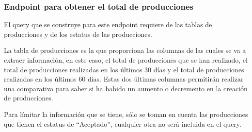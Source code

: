 \subsubsection{Endpoint para obtener el total de producciones}
El query que se construye para este endpoint requiere de las tablas de producciones y de los estatus de las producciones. 

La tabla de producciones es la que proporciona las columnas de las cuales se va a extraer información, en este caso, el total de producciones que se han realizado, el total de producciones realizadas en los últimos 30 días y el total de producciones realizadas en los últimos 60 días. Estas dos últimas columnas permitirán realizar una comparativa para saber si ha habido un aumento o decremento en la creación de producciones.

Para límitar la información que se tiene, sólo se toman en cuenta las producciones que tienen el estatus de ``Aceptado'', cualquier otra no será incluida en el query.